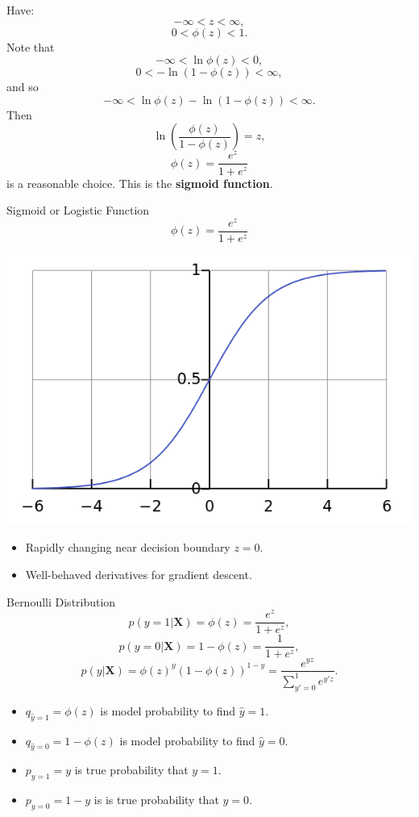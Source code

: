 \documentclass[12pt,t]{beamer}
\begin{document}
\begin{frame}{}

Have:
$$-\infty < z < \infty,$$
$$ 0 < \phi(z)< 1.$$ 
Note that 
$$ -\infty <\ln \phi(z)< 0,$$ 
$$ 0 < - \ln(1-\phi(z))< \infty,$$
and so 
$$ -\infty <\ln \phi(z) - \ln(1-\phi(z))< \infty.$$ 
Then
$$ \ln\left(\frac{ \phi(z)}{1-\phi(z)} \right)= z,$$
$$ \phi(z) = \frac{e^z}{1 + e^z} $$
is a reasonable choice.  This is the {\bf sigmoid function}.

\end{frame}

\begin{frame}{Sigmoid or Logistic Function}
$$ \phi(z) = \frac{e^z}{1 + e^z} $$
\centerline{
\includegraphics[height=0.4\textheight]{Logistic-curve.png}
}


\begin{itemize}
\item Rapidly changing near decision boundary $z = 0 $.
\item Well-behaved derivatives for gradient descent.
\end{itemize}

\end{frame}

\begin{frame}{Bernoulli Distribution}
$$ p(y=1|\mathbf{X}) =  \phi(z)  = \frac{e^z}{1 + e^z},$$
$$ p(y=0|\mathbf{X}) = 1- \phi(z)  = \frac{1}{1 + e^z},$$
$$ p(y|\mathbf{X}) = \phi(z)^y (1- \phi(z) )^{1-y} = \frac{e^{yz}}{\sum_{y' =0}^1 e^{y'z}}.$$

\begin{itemize}
\item $q_{\hat{y}=1}  = \phi(z)$ is model probability to find $\hat{y}=1$.
\item $q_{\hat{y}=0}  =1-\phi(z)$ is model probability to  find $\hat{y}=0$.
\item $p_{y=1}  =y$ is true probability that $y=1$.
\item $p_{y=0}  =1-y$ is is true probability that $y=0$.
\end{itemize}
\end{frame}
\end{document}
